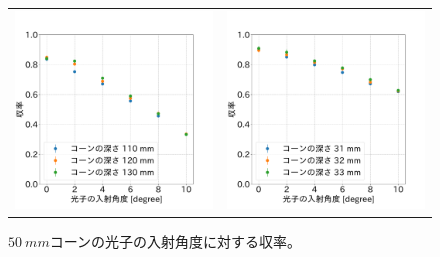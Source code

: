 \begin{figure}[htbp]
  \begin{tabular}{cc}
    \begin{minipage}[t]{0.45\hsize}
      \centering
      \includegraphics[keepaspectratio, scale=0.3]{images/chapter3/cone50_optimize2.pdf}
      \caption{$\SI{50}{mm}$コーンの光子の入射角度に対する収率。}
      \label{fig:cone50_optimize2}
    \end{minipage} &
    \begin{minipage}[t]{0.45\hsize}
      \centering
      \includegraphics[keepaspectratio, scale=0.3]{images/chapter3/cone30_optimize2.pdf}

\end{minipage}
\end{tabular}
\end{figure}
